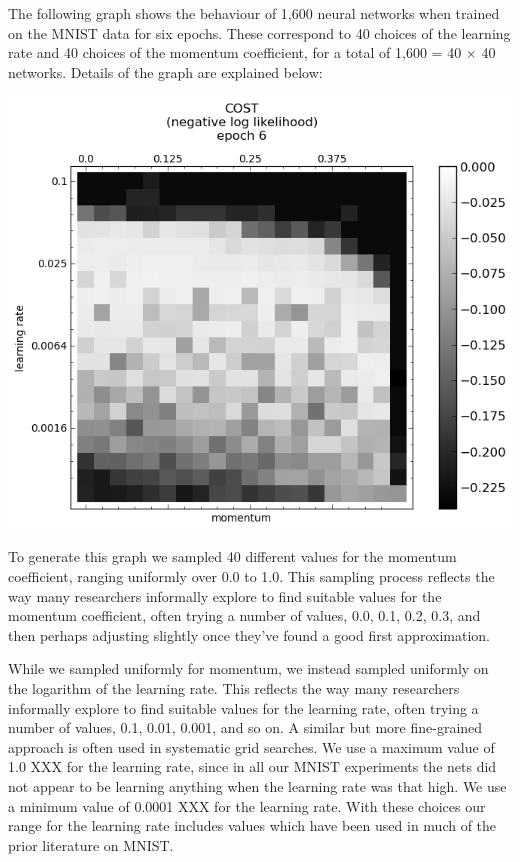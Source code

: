 \documentclass[10pt]{article}
\begin{document}
The following graph shows the behaviour of 1,600 neural networks when
trained on the MNIST data for six epochs. These correspond to 40
choices of the learning rate and 40 choices of the momentum
coefficient, for a total of 1,600 = 40 $\times$ 40 networks.  Details
of the graph are explained below:
%
\begin{center}
\includegraphics[scale=0.5]{plots/detailed/LF-20R10R-20T10-MNIST-6.png}
\end{center}
%
%
%
%
%

To generate this graph we sampled 40 different values for the momentum
coefficient, ranging uniformly over 0.0 to 1.0.  This sampling process
reflects the way many researchers informally explore to find suitable
values for the momentum coefficient, often trying a number of values,
0.0, 0.1, 0.2, 0.3, and then perhaps adjusting slightly once they've
found a good first approximation.

While we sampled uniformly for momentum, we instead sampled uniformly
on the logarithm of the learning rate.  This reflects the way many
researchers informally explore to find suitable values for the
learning rate, often trying a number of values, 0.1, 0.01, 0.001, and
so on.  A similar but more fine-grained approach is often used in
systematic grid searches.  We use a maximum value of 1.0 XXX for the
learning rate, since in all our MNIST experiments the nets did not
appear to be learning anything when the learning rate was that high.
We use a minimum value of 0.0001 XXX for the learning rate.  With
these choices our range for the learning rate includes values which
have been used in much of the prior literature on MNIST.
\end{document}
